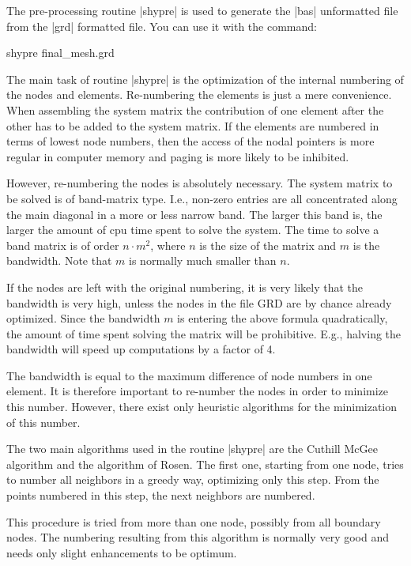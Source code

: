 
The pre-processing routine |shypre| is used to generate the
|bas| unformatted file from the |grd| formatted file.
You can use it with the command:

\begin{code}
     shypre final_mesh.grd
\end{code}

The main task of routine |shypre| is the optimization of the 
internal numbering of the nodes and elements.
Re-numbering the elements is just a mere convenience. When
assembling the system matrix the contribution of
one element after the other has to be added to the system matrix.
If the elements are numbered in terms of lowest node numbers,
then the access of the nodal pointers is more regular in 
computer memory and paging is more likely to be inhibited.

However, re-numbering the nodes is absolutely necessary.
The system matrix to be solved is of band-matrix type.
I.e., non-zero entries are all concentrated along the
main diagonal in a more or less narrow band. The larger this
band is, the larger the amount of cpu time spent to
solve the system. The time to solve a band matrix
is of order $n \cdot m^2$, where $n$ is the size of the
matrix and $m$ is the bandwidth. Note that $m$ is normally
much smaller than $n$.

If the nodes are left with the original numbering, it is very likely
that the bandwidth is very high, unless the nodes in the
file GRD are by chance already optimized. Since the bandwidth $m$
is entering the above formula quadratically, the amount
of time spent solving the matrix will be prohibitive.
E.g., halving the bandwidth will speed up computations by
a factor of 4.

The bandwidth is equal to the maximum difference of node numbers
in one element. It is therefore important to re-number the
nodes in order to minimize this number. However, there exist
only heuristic algorithms for the minimization of this number.

The two main algorithms used in the routine |shypre| are
the Cuthill McGee algorithm and the algorithm of Rosen. The first
one, starting from one node, tries to number all neighbors in
a greedy way, optimizing only this step. From the points
numbered in this step, the next neighbors are numbered.

This procedure is tried from more than one node, possibly
from all boundary nodes. The numbering resulting from this
algorithm is normally very good and needs only slight
enhancements to be optimum.

